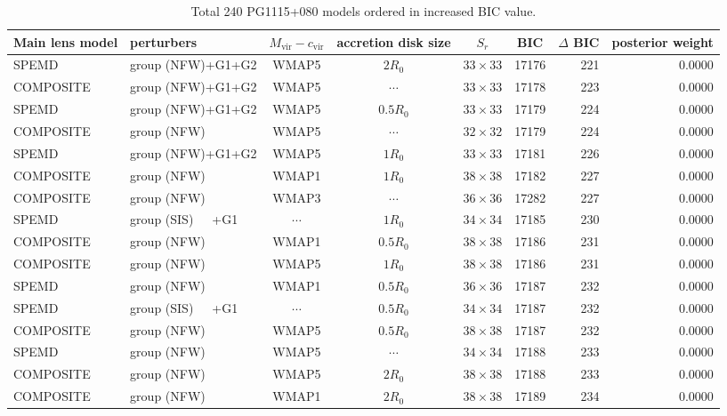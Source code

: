 \documentclass[useAMS,usenatbib]{mnras}
\def\nomicro{$\cdots$}
\def\nodata{$\cdots$}
\begin{document}
\begin{table}
    \centering
    \caption{Total 240 PG1115+080 models ordered in increased BIC value.}
    \label{tab:6TD_3}
    \begin{tabular}{llccccrr}
        \hline
        Main lens model & perturbers &$M_{\textrm{vir}}-c_{\textrm{vir}}$& accretion disk size & $S_{r}$ & BIC & $\Delta$ BIC & posterior weight\\
        \hline
        SPEMD     & group (NFW)+G1+G2 &WMAP5 & $2R_{0}$&$33\times33$ & 17176 & 221 & 0.0000\\
        COMPOSITE & group (NFW)+G1+G2 &WMAP5 & \nomicro&$33\times33$ & 17178 & 223 & 0.0000\\
        SPEMD     & group (NFW)+G1+G2 &WMAP5 & $0.5R_{0}$&$33\times33$ & 17179 & 224 & 0.0000\\
        COMPOSITE & group (NFW)       &WMAP5 & \nomicro&$32\times32$ & 17179 & 224 & 0.0000\\
        SPEMD     & group (NFW)+G1+G2 &WMAP5 & $1R_{0}$&$33\times33$ & 17181 & 226 & 0.0000\\
        COMPOSITE & group (NFW)       &WMAP1 & $1R_{0}$&$38\times38$ & 17182 & 227 & 0.0000\\
        COMPOSITE & group (NFW)       &WMAP3 & \nomicro&$36\times36$ & 17282 & 227 & 0.0000\\
        SPEMD     & group (SIS)~~~+G1 &\nodata& $1R_{0}$&$34\times34$ & 17185 & 230 & 0.0000\\
        COMPOSITE & group (NFW)       &WMAP1 & $0.5R_{0}$&$38\times38$ & 17186 & 231 & 0.0000\\
        COMPOSITE & group (NFW)       &WMAP5 & $1R_{0}$&$38\times38$   & 17186 & 231 & 0.0000\\
        SPEMD     & group (NFW)       &WMAP1 & $0.5R_{0}$&$36\times36$ & 17187 & 232 & 0.0000\\
        SPEMD     & group (SIS)~~~+G1 &\nodata& $0.5R_{0}$&$34\times34$& 17187 & 232 & 0.0000\\
        COMPOSITE & group (NFW)       &WMAP5 & $0.5R_{0}$&$38\times38$ & 17187 & 232 & 0.0000\\
        SPEMD     & group (NFW)       &WMAP5 & \nomicro&$34\times34$   & 17188 & 233 & 0.0000\\
        COMPOSITE & group (NFW)       &WMAP5 & $2R_{0}$&$38\times38$   & 17188 & 233 & 0.0000\\
        COMPOSITE & group (NFW)       &WMAP1 & $2R_{0}$&$38\times38$   & 17189 & 234 & 0.0000\\

\end{tabular}
\end{table}
\end{document}
